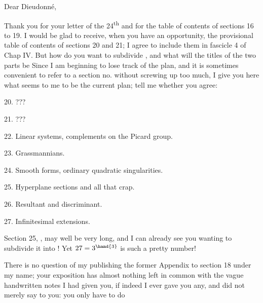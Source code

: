 

Dear Dieudonné,

Thank you for your letter of the 24\textsuperscript{th} and for the table of contents of sections
16 to 19. I would be glad to receive, when you have an opportunity, the provisional table
of contents of sections 20 and 21; I agree to include them in
fascicle 4 of Chap IV. But how do you want to subdivide , and
what will the titles of the two parts be  Since I am beginning to
lose track of the plan, and it is sometimes convenient to  refer
to a section no. without screwing up too much, I give you here what
seems to me to be the current plan; tell me whether you agree:

20. ???

21. ???

22. Linear systems, complements on the Picard group.

23. Grassmannians.

24. Smooth forms, ordinary quadratic singularities.

25. Hyperplane sections and all that crap.

26. Resultant and discriminant.

27. Infinitesimal extensions.

Section 25, , may well be very long, and I can already see you
wanting to subdivide it into ! Yet $27=3^{\hand{3}}$ is such a pretty
number!

There is no question of my publishing the former Appendix to section 18
under my name; your exposition has almost nothing left in common with
the vague handwritten notes I had given you, if indeed I ever
gave you any, and did not merely say to you: you only have to do

